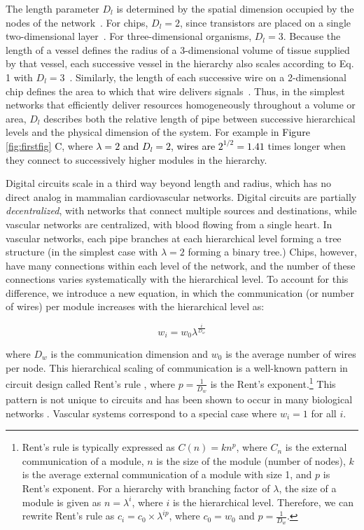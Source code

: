 \documentclass[12pt]{article}
\newcommand{\red}[1]{\textcolor{black}{#1}}
\begin{document}
The length parameter $D_l$ is determined by the spatial dimension occupied by the
nodes of the network~\cite{mandelbrot83}.  For chips, $D_l = 2$, since
transistors are placed on a single two-dimensional layer~\cite{donath81}. For
three-dimensional organisms,  $D_l = 3$. Because the length of a
vessel defines the radius of a 3-dimensional volume of tissue supplied
by that vessel, each successive vessel in the hierarchy also scales
according to Eq. 1 with $D_l = 3$~\cite{west97, banavar10}. Similarly,
the length of each successive wire on a 2-dimensional chip defines the
area to which that wire delivers signals~\cite{moses08}. Thus, in the simplest networks that efficiently deliver resources homogeneously throughout a volume or area, $D_l$ describes both the relative length of pipe between successive hierarchical levels and the physical
dimension of the system. For example in \red{Figure \ref{fig:firstfig} C}, where \red{$\lambda = 2$ and $D_l = 2$, wires are $2^{1/2} = 1.41$} times longer when they connect to successively higher modules in the hierarchy.

Digital circuits scale in a third way beyond length and radius, which
has no direct analog in mammalian cardiovascular networks. Digital circuits are partially \emph{decentralized}, with networks that connect multiple sources and destinations, while vascular networks are
centralized, with blood flowing from a single heart. 
In vascular networks, each pipe
branches at each hierarchical level forming a tree structure
(in the simplest case with $\lambda = 2$ forming
a binary tree.) Chips, however, have many connections within each
level of the network, and the number of these connections
varies systematically with the hierarchical level.  
 To account for
this difference, we introduce a new equation, in which the
communication (or number of wires) per module increases with the
hierarchical level as:  

\begin{equation}
  w_i = w_0 \lambda^{\frac{i}{D_w}}
\label{eq:communication}
\end{equation}

\noindent where $D_w$ is the communication dimension and $w_0$ is the average
number of wires per node.  This hierarchical scaling of communication is a
well-known pattern in circuit design called Rent's rule \cite{christie00},
where $p = \frac{1}{D_w}$ is the Rent's exponent.\footnote{Rent's rule is typically
  expressed as $C(n) = kn^p$, where $C_n$ is the external communication of a
  module, $n$ is the size of the module (number of nodes), $k$ is the average
  external communication of a module with size 1, and $p$ is Rent's
  exponent. For a hierarchy with branching factor of $\lambda$, the size of a
  module is given as $n = \lambda^i$, where $i$ is the hierarchical level.
  Therefore, we can rewrite Rent's rule as $c_i = c_0 \times \lambda^{ip}$,
where $c_0 = w_0$ and $p = \frac{1}{D_w}$.} This pattern is not unique to circuits
and has been shown to occur in many biological networks
\cite{reda09,bassett10,meunier2010modular,solee2013evolutionary}.   Vascular systems correspond to a special case where 
$w_i = 1$ for all $i$. 
\end{document}
